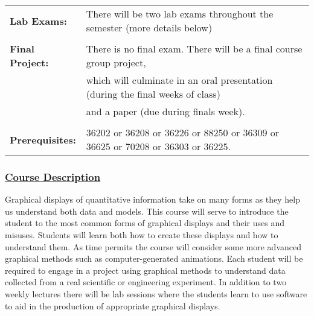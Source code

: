 \documentclass[11pt]{article}
\begin{document}
\begin{tabular}{ll}
{\bf Lab Exams:} & There will be two lab exams throughout the semester (more details below)\\

\vspace*{.1in}\\

{\bf Final Project:} & There is no final exam.  There will be a final course group project, \\ & which will culminate in an oral presentation (during the final weeks of class) \\ & and a paper (due during finals week).\\


\vspace*{.1in}\\

 {\bf Prerequisites:} 
& 36202 or 36208 or 36226 or 88250 or 36309 or 36625 or 70208 or 36303 or 36225.\\







\end{tabular}


\subsubsection*{\underline{Course Description}}

Graphical displays of quantitative information take on many forms as they help us understand both data and models. This course will serve to introduce the student to the most common forms of graphical displays and their uses and misuses. Students will learn both how to create these displays and how to understand them. As time permits the course will consider some more advanced graphical methods such as computer-generated animations. Each student will be required to engage in a project using graphical methods to understand data collected from a real scientific or engineering experiment. In addition to two weekly lectures there will be lab sessions where the students learn to use software to aid in the production of appropriate graphical displays.
 
\end{document}
